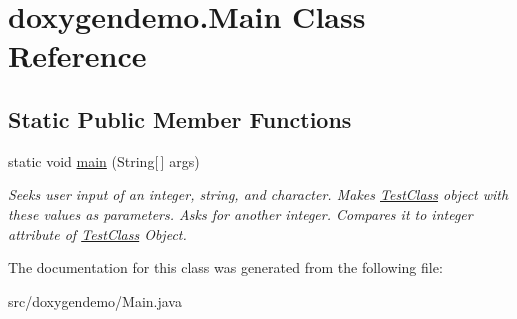 \hypertarget{classdoxygendemo_1_1_main}{}\section{doxygendemo.\+Main Class Reference}
\label{classdoxygendemo_1_1_main}
\subsection*{Static Public Member Functions}
\begin{DoxyCompactItemize}
\item 
\mbox{\label{classdoxygendemo_1_1_main_a6e973ff7ff8b0c403635cc9bb8feb443}} 
static void \hyperlink{classdoxygendemo_1_1_main_a6e973ff7ff8b0c403635cc9bb8feb443}{main} (String\mbox{[}$\,$\mbox{]} args)
\begin{DoxyCompactList}\small\item\em Seeks user input of an integer, string, and character. Makes \hyperlink{classdoxygendemo_1_1_test_class}{Test\+Class} object with these values as parameters. Asks for another integer. Compares it to integer attribute of \hyperlink{classdoxygendemo_1_1_test_class}{Test\+Class} Object. \end{DoxyCompactList}\end{DoxyCompactItemize}


The documentation for this class was generated from the following file\+:\begin{DoxyCompactItemize}
\item 
src/doxygendemo/Main.\+java\end{DoxyCompactItemize}
